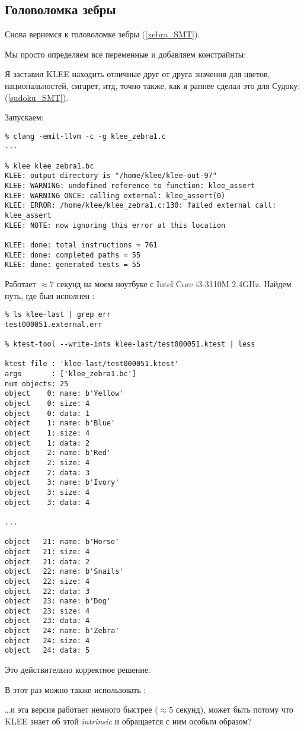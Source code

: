 \subsection{Головоломка зебры}

Снова вернемся к головоломке зебры (\ref{xebra_SMT}).

Мы просто определяем все переменные и добавляем констрайнты:



Я заставил KLEE находить отличные друг от друга значения для цветов, национальностей, сигарет, итд, точно также,
как я раннее сделал это для Судоку: (\ref{sudoku_SMT}).

Запускаем:

\begin{lstlisting}
% clang -emit-llvm -c -g klee_zebra1.c
...

% klee klee_zebra1.bc
KLEE: output directory is "/home/klee/klee-out-97"
KLEE: WARNING: undefined reference to function: klee_assert
KLEE: WARNING ONCE: calling external: klee_assert(0)
KLEE: ERROR: /home/klee/klee_zebra1.c:130: failed external call: klee_assert
KLEE: NOTE: now ignoring this error at this location

KLEE: done: total instructions = 761
KLEE: done: completed paths = 55
KLEE: done: generated tests = 55
\end{lstlisting}

Работает $\approx 7$ секунд на моем ноутбуке с Intel Core i3-3110M 2.4GHz.
Найдем путь, где был исполнен :

\begin{lstlisting}
% ls klee-last | grep err
test000051.external.err

% ktest-tool --write-ints klee-last/test000051.ktest | less

ktest file : 'klee-last/test000051.ktest'
args       : ['klee_zebra1.bc']
num objects: 25
object    0: name: b'Yellow'
object    0: size: 4
object    0: data: 1
object    1: name: b'Blue'
object    1: size: 4
object    1: data: 2
object    2: name: b'Red'
object    2: size: 4
object    2: data: 3
object    3: name: b'Ivory'
object    3: size: 4
object    3: data: 4

...

object   21: name: b'Horse'
object   21: size: 4
object   21: data: 2
object   22: name: b'Snails'
object   22: size: 4
object   22: data: 3
object   23: name: b'Dog'
object   23: size: 4
object   23: data: 4
object   24: name: b'Zebra'
object   24: size: 4
object   24: data: 5
\end{lstlisting}

Это действительно корректное решение.

В этот раз можно также использовать :



\dots и эта версия работает немного быстрее ($\approx 5$ секунд),
может быть потому что KLEE знает об этой \textit{intrinsic} и обращается с ним особым образом?

